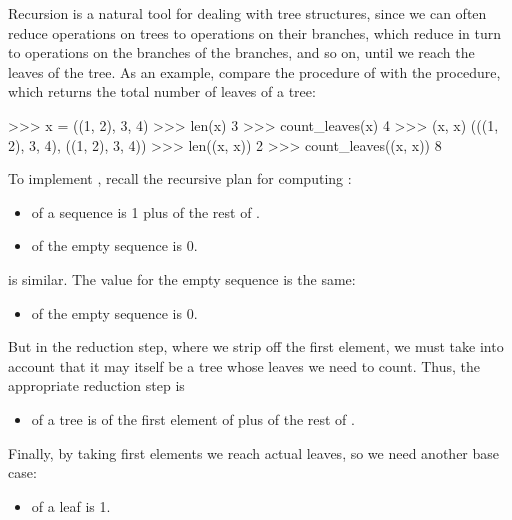 Recursion is a natural tool for dealing with tree structures, since we can
often reduce operations on trees to operations on their branches, which reduce
in turn to operations on the branches of the branches, and so on, until we
reach the leaves of the tree.  As an example, compare the 
procedure of  with the  procedure,
which returns the total number of leaves of a tree:

\begin{codeBlock}
>>> x = ((1, 2), 3, 4)
>>> len(x)
3
>>> count_leaves(x)
4
>>> (x, x)
(((1, 2), 3, 4), ((1, 2), 3, 4))
>>> len((x, x))
2
>>> count_leaves((x, x))
8
\end{codeBlock}

\noindent
To implement , recall the recursive plan for computing
:

\begin{itemize}
\item
{} of a sequence  is 1 plus  of the rest of
.

\item
{} of the empty sequence is 0.
\end{itemize}

\noindent
{} is similar.  The value for the empty sequence is the same:

\begin{itemize}
\item
{} of the empty sequence is 0.
\end{itemize}

\noindent
But in the reduction step, where we strip off the first element, we must take
into account that it may itself be a tree whose leaves we need to count.  Thus,
the appropriate reduction step is

\begin{itemize}
\item
{} of a tree  is  of the first
element of  plus  of the rest of .
\end{itemize}

\noindent
Finally, by taking first elements we reach actual leaves, so we need another
base case:

\begin{itemize}
\item
{} of a leaf is 1.
\end{itemize}

